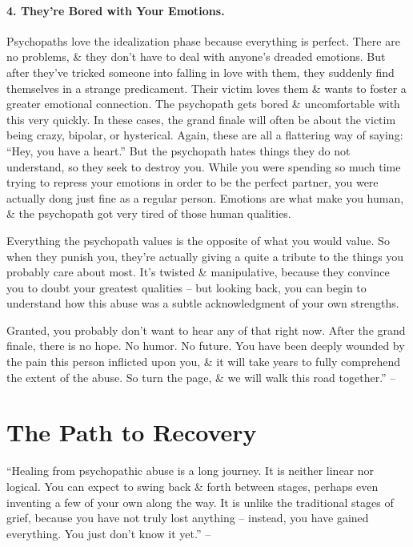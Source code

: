 \documentclass{article}
\numberwithin{equation}{section}
\begin{document}
\paragraph{4. They're Bored with Your Emotions.} Psychopaths love the idealization phase because everything is perfect. There are no problems, \& they don't have to deal with anyone's dreaded emotions. But after they've tricked someone into falling in love with them, they suddenly find themselves in a strange predicament. Their victim loves them \& wants to foster a greater emotional connection. The psychopath gets bored \& uncomfortable with this very quickly. In these cases, the grand finale will often be about the victim being crazy, bipolar, or hysterical. Again, these are all a flattering way of saying: ``Hey, you have a heart.'' But the psychopath hates things they do not understand, so they seek to destroy you. While you were spending so much time trying to repress your emotions in order to be the perfect partner, you were actually dong just fine as a regular person. Emotions are what make you human, \& the psychopath got very tired of those human qualities.

Everything the psychopath values is the opposite of what you would value. So when they punish you, they're actually giving a quite a tribute to the things you probably care about most. It's twisted \& manipulative, because they convince you to doubt your greatest qualities -- but looking back, you can begin to understand how this abuse was a subtle acknowledgment of your own strengths.

Granted, you probably don't want to hear any of that right now. After the grand finale, there is no hope. No humor. No future. You have been deeply wounded by the pain this person inflicted upon you, \& it will take years to fully comprehend the extent of the abuse. So turn the page, \& we will walk this road together.'' -- \cite[pp. 83--85]{MacKenzie2015}


\section{The Path to Recovery}
``Healing from psychopathic abuse is a long journey. It is neither linear nor logical. You can expect to swing back \& forth between stages, perhaps even inventing a few of your own along the way. It is unlike the traditional stages of grief, because you have not truly lost anything -- instead, you have gained everything. You just don't know it yet.'' -- \cite[p. 86]{MacKenzie2015}
\end{document}
